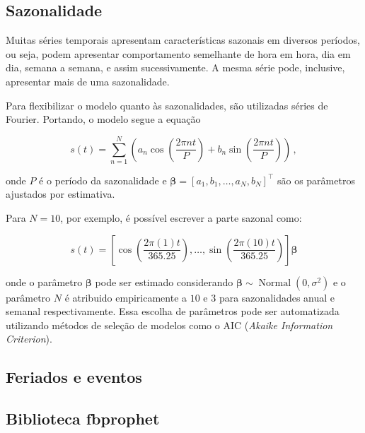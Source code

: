 \subsection{Sazonalidade}
Muitas séries temporais apresentam características sazonais em diversos períodos, ou seja, podem apresentar comportamento semelhante de hora em hora, dia em dia, semana a semana, e assim sucessivamente. A mesma série pode, inclusive, apresentar mais de uma sazonalidade.

Para flexibilizar o modelo quanto às sazonalidades, são utilizadas séries de Fourier. Portando, o modelo segue a equação

\begin{equation}
    s(t)=\sum_{n=1}^{N}\left(a_{n} \cos \left(\frac{2 \pi n t}{P}\right)+b_{n} \sin \left(\frac{2 \pi n t}{P}\right)\right)\, ,
\end{equation}

onde $P$ é o período da sazonalidade e $\boldsymbol{\beta} = [a_{1},b_{1},\ldots,a_{N},b_{N}]^{\top}$ são os parâmetros ajustados por estimativa.

Para $N=10$, por exemplo, é possível escrever a parte sazonal como:

\begin{equation}
    s(t)=\left[\cos \left(\frac{2 \pi(1) t}{365.25}\right), \ldots, \sin \left(\frac{2 \pi(10) t}{365.25}\right)\right]\boldsymbol{\beta}
\end{equation}

onde o parâmetro $\boldsymbol{\beta}$ pode ser estimado considerando $\boldsymbol{\beta} \sim \operatorname{Normal}\left(0, \sigma^{2}\right)$ e o parâmetro $N$ é atribuido empiricamente a $10$ e $3$ para sazonalidades anual e semanal respectivamente. Essa escolha de parâmetros pode ser automatizada utilizando métodos de seleção de modelos como o AIC (\textit{Akaike Information Criterion}).

\subsection{Feriados e eventos}
\subsection{Biblioteca fbprophet}
